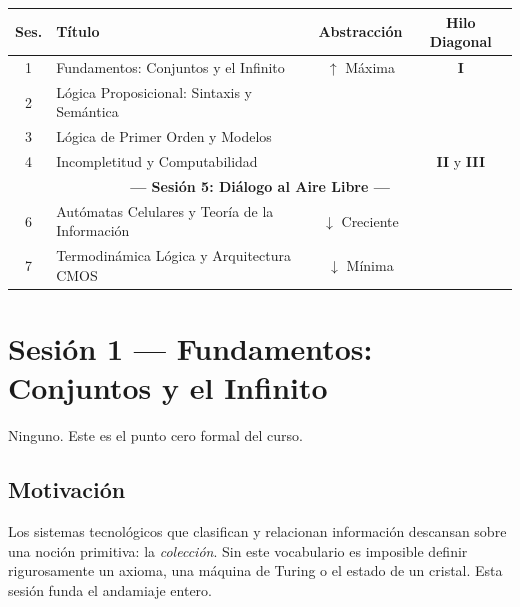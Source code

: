 \documentclass[11pt, letterpaper]{article}
\begin{document}
\begin{center}
\renewcommand{\arraystretch}{1.45}
\begin{tabular}{clcc}
\toprule
\textbf{Ses.} & \textbf{T\'itulo} & \textbf{Abstracci\'on} & \textbf{Hilo Diagonal} \\
\midrule
1  & Fundamentos: Conjuntos y el Infinito        & $\uparrow$ M\'axima & \textcolor{diagonalred}{\textbf{I}} \\
2  & L\'ogica Proposicional: Sintaxis y Sem\'antica & & \\
3  & L\'ogica de Primer Orden y Modelos          & & \\
4  & Incompletitud y Computabilidad              & & \textcolor{diagonalred}{\textbf{II} y \textbf{III}} \\
\midrule
\multicolumn{4}{c}{\textcolor{outdoorgreen}{\textbf{--- Sesi\'on 5: Di\'alogo al Aire Libre ---}}} \\
\midrule
6  & Aut\'omatas Celulares y Teor\'ia de la Informaci\'on & $\downarrow$ Creciente & \\
7  & Termodin\'amica L\'ogica y Arquitectura CMOS   & $\downarrow$ M\'inima & \\
\bottomrule
\end{tabular}
\end{center}

\vspace{0.4em}


\newpage

\section{Sesi\'on 1 --- Fundamentos: Conjuntos y el Infinito}

\begin{prereqs}
Ninguno. Este es el punto cero formal del curso.
\end{prereqs}

\subsection*{Motivaci\'on}
Los sistemas tecnol\'ogicos que clasifican y relacionan informaci\'on descansan sobre una noci\'on primitiva: la \emph{colecci\'on}.
Sin este vocabulario es imposible definir rigurosamente un axioma, una m\'aquina de Turing o el estado de un cristal.
Esta sesi\'on funda el andamiaje entero.
\end{document}
